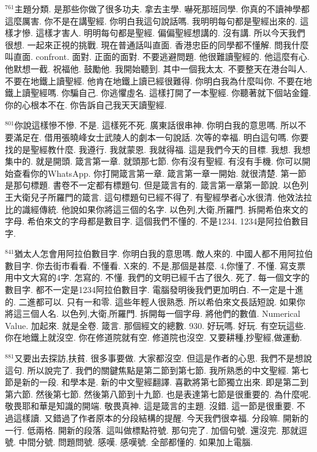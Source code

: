 \documentclass{book}
\begin{document}
$^{761}$主題分類.
是那些你做了很多功夫.
拿去主學.
嚇死那班同學.
你真的不讀神學都這麼厲害.
你不是在講聖經.
你明白我這句說話嗎.
我明明每句都是聖經出來的.
這樣才慘.
這樣才害人.
明明每句都是聖經.
偏偏聖經想講的.
沒有講.
所以今天我們很想.
一起來正視的挑戰.
現在普通話叫直面.
香港忠臣的同學都不懂解.
問我什麼叫直面.
confront.
面對.
正面的面對.
不要逃避問題.
他很難讀聖經的.
他這麼有心.
他默想一截.
祝福他.
鼓勵他.
我開始聽到.
其中一個我太太.
不要整天在港台叫人.
不要在地鐵上讀聖經.
他肯在地鐵上讀已經很難得.
你明白我為什麼叫你.
不要在地鐵上讀聖經嗎.
你騙自己.
你逃懼虛名.
這樣打開了一本聖經.
你聽著就下個站金鐘.
你的心根本不在.
你告訴自己我天天讀聖經.

$^{801}$你說這樣慘不慘.
不是.
這樣死不死.
廣東話很串神.
你明白我的意思嗎.
所以不要滿足在.
借用張曉峰女士武陵人的劇本一句說話.
次等的幸福.
明白這句嗎.
你要找的是聖經教什麼.
我遵行.
我就蒙恩.
我就得福.
這是我們今天的目標.
我想.
我想集中的.
就是開頭.
箴言第一章.
就頭那七節.
你有沒有聖經.
有沒有手機.
你可以開始查看你的WhatsApp.
你打開箴言第一章.
箴言第一章一開始.
就很清楚.
第一節是那句標題.
書卷不一定都有標題句.
但是箴言有的.
箴言第一章第一節說.
以色列王大衛兒子所羅門的箴言.
這句標題句已經不得了.
有聖經學者心水很清.
他效法拉比的識經傳統.
他說如果你將這三個的名字.
以色列,大衛,所羅門.
拆開希伯來文的字母.
希伯來文的字母都是數目字.
這個我們不懂的.
不是1234.
1234是阿拉伯數目字.

$^{841}$猶太人怎會用阿拉伯數目字.
你明白我的意思嗎.
敵人來的.
中國人都不用阿拉伯數目字.
你去街市看看.
不懂看.
X來的.
不是,那個是甚麼.
4,你懂了.
不懂.
寫支票用中文大寫的4字.
怎寫的.
不懂.
我們的文明已經千古了很久.
死了.
每一個文字的數目字.
都不一定是1234阿拉伯數目字.
電腦發明後我們更加明白.
不一定是十進的.
二進都可以.
只有一和零.
這些年輕人很熟悉.
所以希伯來文長話短說.
如果你將這三個人名.
以色列,大衛,所羅門.
拆開每一個字母.
將他們的數值.
Numerical Value.
加起來.
就是全卷.
箴言.
那個經文的總數.
930.
好玩嗎.
好玩.
有空玩這些.
你在地鐵上就沒空.
你在修道院就有空.
修道院也沒空.
又要耕種,抄聖經,做運動.

$^{881}$又要出去探訪,扶貧.
很多事要做.
大家都沒空.
但這是作者的心思.
我們不是想說這句.
所以說完了.
我們的關鍵焦點是第二節到第七節.
我所熟悉的中文聖經.
第七節是新的一段.
和學本是.
新的中文聖經翻譯.
喜歡將第七節獨立出來.
即是第二到第六節.
然後第七節.
然後第八節到十九節.
也是表達第七節是很重要的.
為什麼呢.
敬畏耶和華是知識的開端.
敬畏真神.
這是箴言的主題.
沒錯.
這一節是很重要.
不過這樣讀.
又錯過了作者原本的分段結構的提醒.
今天我們很幸福.
分段嘛.
開新的一行.
低兩格.
開新的段落.
這叫做標點符號.
那句完了.
加個句號.
還沒完.
那就逗號.
中間分號.
問題問號.
感嘆.
感嘆號.
全部都懂的.
如果加上電腦.
\end{document}
